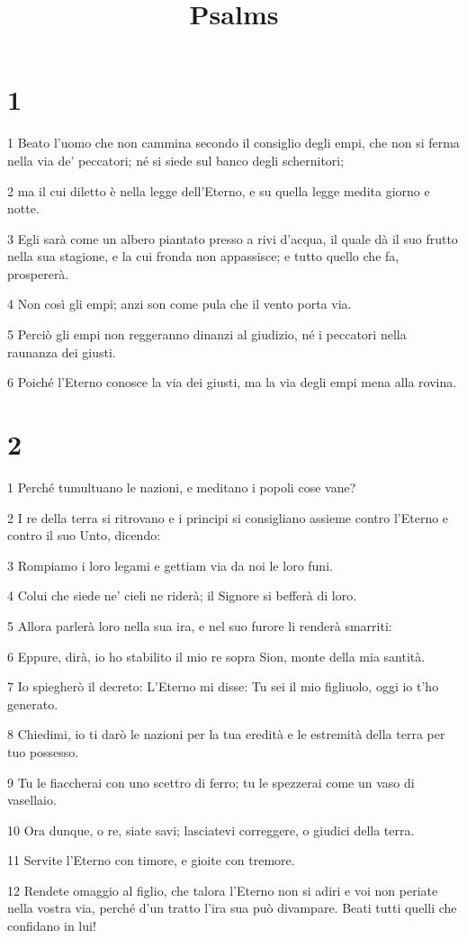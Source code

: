 

\title{Psalms}


\chapter{1}

\par 1 Beato l'uomo che non cammina secondo il consiglio degli empi, che non si ferma nella via de' peccatori; né si siede sul banco degli schernitori;
\par 2 ma il cui diletto è nella legge dell'Eterno, e su quella legge medita giorno e notte.
\par 3 Egli sarà come un albero piantato presso a rivi d'acqua, il quale dà il suo frutto nella sua stagione, e la cui fronda non appassisce; e tutto quello che fa, prospererà.
\par 4 Non così gli empi; anzi son come pula che il vento porta via.
\par 5 Perciò gli empi non reggeranno dinanzi al giudizio, né i peccatori nella raunanza dei giusti.
\par 6 Poiché l'Eterno conosce la via dei giusti, ma la via degli empi mena alla rovina.

\chapter{2}

\par 1 Perché tumultuano le nazioni, e meditano i popoli cose vane?
\par 2 I re della terra si ritrovano e i principi si consigliano assieme contro l'Eterno e contro il suo Unto, dicendo:
\par 3 Rompiamo i loro legami e gettiam via da noi le loro funi.
\par 4 Colui che siede ne' cieli ne riderà; il Signore si befferà di loro.
\par 5 Allora parlerà loro nella sua ira, e nel suo furore li renderà smarriti:
\par 6 Eppure, dirà, io ho stabilito il mio re sopra Sion, monte della mia santità.
\par 7 Io spiegherò il decreto: L'Eterno mi disse: Tu sei il mio figliuolo, oggi io t'ho generato.
\par 8 Chiedimi, io ti darò le nazioni per la tua eredità e le estremità della terra per tuo possesso.
\par 9 Tu le fiaccherai con uno scettro di ferro; tu le spezzerai come un vaso di vasellaio.
\par 10 Ora dunque, o re, siate savi; lasciatevi correggere, o giudici della terra.
\par 11 Servite l'Eterno con timore, e gioite con tremore.
\par 12 Rendete omaggio al figlio, che talora l'Eterno non si adiri e voi non periate nella vostra via, perché d'un tratto l'ira sua può divampare. Beati tutti quelli che confidano in lui!

